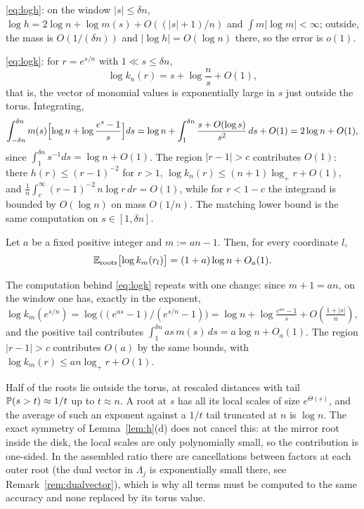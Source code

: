 \proof
\eqref{eq:logh}: on the window $|s|\le\delta n$,
$\log h = 2\log n + \log m(s) + O((|s|+1)/n)$ and $\int m|\log m|<\infty$; outside, the mass
is $O(1/(\delta n))$ and $|\log h| = O(\log n)$ there, so the error is $o(1)$.

\eqref{eq:logk}: for $r=e^{s/n}$ with $1\ll s\le\delta n$,
\[
  \log k_n(r) = s + \log\frac ns + O(1),
\]
that is, the vector of monomial values is exponentially large in $s$ just outside the torus.
Integrating,
\[
  \int_{-\delta n}^{\delta n} m(s)\Bigl[\log n + \log\frac{e^s-1}s\Bigr]ds
  = \log n + \int_1^{\delta n}\frac{s+O(\log s)}{s^2}\,ds + O(1) = 2\log n + O(1),
\]
since $\int_1^{\delta n}s^{-1}ds = \log n + O(1)$. The region $|r-1|>c$ contributes $O(1)$:
there $h(r)\le(r-1)^{-2}$ for $r>1$, $\log k_n(r)\le(n+1)\log_+r+O(1)$, and
$\frac1n\int_c^\infty(r-1)^{-2}\,n\log r\,dr = O(1)$, while for $r<1-c$ the integrand is
bounded by $O(\log n)$ on mass $O(1/n)$. The matching lower bound is the same computation on
$s\in[1,\delta n]$.
\endproof

\begin{corollary}\label{cor:logkm}
  Let $a$ be a fixed positive integer and $m := an-1$. Then, for every coordinate $l$,
  \[
    \Eroots\bigl[\log k_m(r_l)\bigr] = (1+a)\log n + O_a(1).
  \]
\end{corollary}

\proof
The computation behind \eqref{eq:logk} repeats with one change: since $m+1=an$, on the window
one has, exactly in the exponent,
$\log k_m(e^{s/n}) = \log\bigl((e^{as}-1)/(e^{s/n}-1)\bigr)
= \log n + \log\frac{e^{as}-1}s + O(\frac{1+|s|}n)$, and the positive tail contributes
$\int_1^{\delta n}as\,m(s)\,ds = a\log n + O_a(1)$. The region $|r-1|>c$ contributes $O(a)$
by the same bounds, with $\log k_m(r)\le an\log_+r + O(1)$.
\endproof

\begin{remark}\label{rem:outer}
  Half of the roots lie outside the torus, at rescaled distances with tail
  $\P(s>t)\approx1/t$ up to $t\approx n$. A root at $s$ has all its local scales of size
  $e^{\Theta(s)}$, and the average of such an exponent against a $1/t$ tail truncated at $n$
  is $\log n$. The exact symmetry of Lemma~\ref{lem:h}(d) does not cancel this: at the mirror
  root inside the disk, the local scales are only polynomially small, so the contribution is
  one-sided. In the assembled ratio there are cancellations between factors at each outer
  root (the dual vector in $\Lambda_j$ is exponentially small there, see
  Remark~\ref{rem:dualvector}), which is why all terms must be computed to the same accuracy
  and none replaced by its torus value.
\end{remark}

